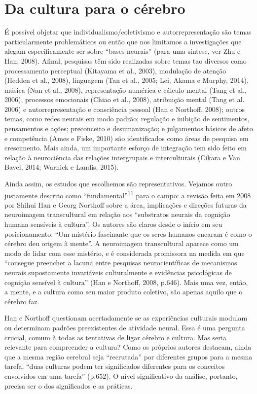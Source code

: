 \chapter{Da cultura para o cérebro}

É possível objetar que individualismo/coletivismo e autorrepresentação
são temas particularmente problemáticos ou então que nos limitamos a
investigações que alegam especificamente ser sobre ``bases neurais''
(para uma síntese, ver Zhu e Han, 2008). Afinal, pesquisas têm sido
realizadas sobre temas tao diversos como processamento perceptual
(Kitayama et al., 2003), modulação de atenção (Hedden et al., 2008),
linguagem (Tan et al., 2005; Lei, Akama e Murphy, 2014), música (Nan et
al., 2008), representação numérica e cálculo mental (Tang et al., 2006),
processos emocionais (Chiao et al., 2008), atribuição mental (Tang et
al. 2006) e autorrepresentação e consciência pessoal (Han e Northoff,
2008); outros temas, como redes neurais em modo padrão; regulação e
inibição de sentimentos, pensamentos e ações; preconceito e
desumanização; e julgamentos básicos de afeto e competência (Ames e
Fiske, 2010) são identificados como áreas de pesquisa em crescimento.
Mais ainda, um importante esforço de integração tem sido feito em
relação à neurociência das relações intergrupais e interculturais
(Cikara e Van Bavel, 2014; Warnick e Landis, 2015).

Ainda assim, os estudos que escolhemos são representativos. Vejamos
outro justamente descrito como ``fundamental''\textsuperscript{11} para
o campo: a revisão feita em 2008 por Shihui Han e Georg Northoff sobre a
área, implicações e direções futuras da neuroimagem transcultural em
relação aos ``substratos neurais da cognição humana sensíveis à
cultura''. Os autores são claros desde o início em seu posicionamento:
``Um mistério fascinante que os seres humanos encaram é como o cérebro
deu origem à mente''. A neuroimagem transcultural aparece como um modo
de lidar com esse mistério, e é considerada promissora na medida em que
``consegue preencher a lacuna entre pesquisas neurocientíficas de
mecanismos neurais supostamente invariáveis culturalmente e evidências
psicológicas de cognição sensível à cultura'' (Han e Northoff, 2008,
p.646). Mais uma vez, então, a mente, e a cultura como seu maior produto
coletivo, são apenas aquilo que o cérebro faz.

Han e Northoff questionam acertadamente se as experiências culturais
modulam ou determinam padrões preexistentes de atividade neural. Essa é
uma pergunta crucial, comum à todas as tentativas de ligar cérebro e
cultura. Mas seria relevante para compreender a cultura? Como os
próprios autores destacam, ainda que a mesma região cerebral seja
``recrutada'' por diferentes grupos para a mesma tarefa, ``duas culturas
podem ter significados diferentes para os conceitos envolvidos em uma
tarefa'' (p.652). O nível significativo da análise, portanto, precisa
ser o dos significados e as práticas.


